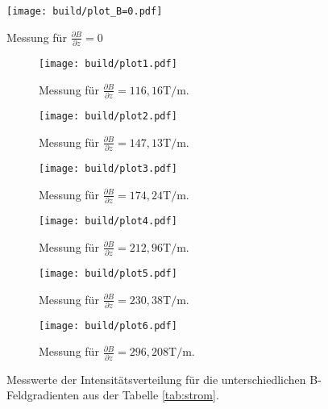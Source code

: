 \begin{figure}
  \centering
  \texttt{[image: build/plot\_B=0.pdf]}
  \caption{Messung für $\frac{\partial B}{\partial z}=0$ }
  \label{fig:mess0}
\end{figure}

\begin{figure}
   \centering
   \begin{subfigure}{0.48\textwidth}
      \texttt{[image: build/plot1.pdf]}
      \caption{Messung für $\frac{\partial B}{\partial z}=116,16\si{\tesla\per\meter}$. }
      \label{fig:mess1}
     \end{subfigure}
     \begin{subfigure}{0.48\textwidth}
       \texttt{[image: build/plot2.pdf]}
       \caption{Messung für $\frac{\partial B}{\partial z}=  147,13\si{\tesla\per\meter}$. }
       \label{fig:mess2}
     \end{subfigure}
     \begin{subfigure}{0.48\textwidth}
       \texttt{[image: build/plot3.pdf]}
       \caption{Messung für $\frac{\partial B}{\partial z}=174,24\si{\tesla\per\meter}$. }
       \label{fig:mess3}
     \end{subfigure}
     \begin{subfigure}{0.48\textwidth}
       \texttt{[image: build/plot4.pdf]}
       \caption{Messung für $\frac{\partial B}{\partial z}=212,96\si{\tesla\per\meter}$. }
       \label{fig:mess4}
     \end{subfigure}
     \begin{subfigure}{0.48\textwidth}
       \texttt{[image: build/plot5.pdf]}
       \caption{Messung für $\frac{\partial B}{\partial z}=230,38\si{\tesla\per\meter}$. }
       \label{fig:mess5}
     \end{subfigure}
     \begin{subfigure}[width=1\textwidth]{0.48\textwidth}
       \texttt{[image: build/plot6.pdf]}
       \caption{Messung für $\frac{\partial B}{\partial z}=296,208\si{\tesla\per\meter}$. }
       \label{fig:mess6}
     \end{subfigure}
     \caption{Messwerte der Intensitätsverteilung für die unterschiedlichen B-Feldgradienten aus der Tabelle \ref{tab:strom}.}
    \label{fig:mess_all}
\end{figure}

